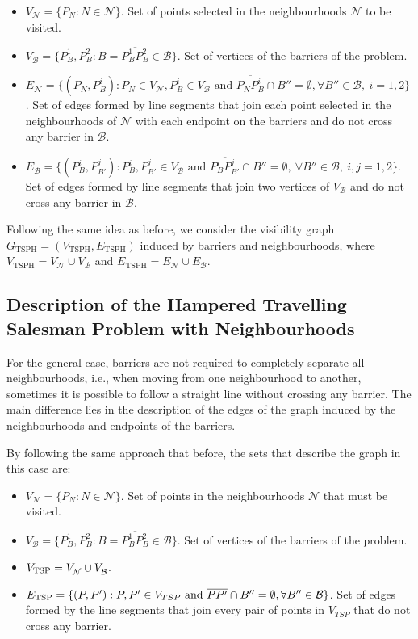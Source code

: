 \documentclass[a4paper,  review, authoryear, 1p.]{elsarticle}
\newcommand{\TSPN}{{\sf{H-TSPN}\xspace }}
\newcommand{\B}{{\mathcal B}}
\newcommand{\VB}{{V^{}_{\mathcal B}}}
\newcommand{\EB}{{E^{}_{\mathcal B}}}
\newcommand{\VN}{{V^{}_{\mathcal N}}}
\newcommand{\EN}{{E^{}_{\mathcal N}}}
\newcommand{\GTSPH}{{G_{\text{TSPH}}}}
\newcommand{\VTSPH}{{V_{\text{TSPH}}}}
\newcommand{\ETSPH}{{E_{\text{TSPH}}}}
\newcommand{\CV}[1]{{\color{red}#1}}
\begin{document}
	\begin{itemize}
		\item $\VN=\{P_N:N\in\mathcal N\}$. Set of points selected in the neighbourhoods $\mathcal N$ to be visited.
		\item $\VB=\{P^1_B, P^2_B:B=\overline{P^1_B P^2_B}\in \mathcal B\}$. Set of vertices of the barriers of the problem.
		\item $\EN=\{(P_N, P^i_{B}):P_N\in\VN, P^i_B\in V_\B\text{ and } \overline{P_NP^i_B}\cap B''=\emptyset,\forall B''\in\B,\:i=1,2\}$. Set of edges formed by line segments that join each point selected in the neighbourhoods of $\mathcal N$ with each endpoint on the barriers and do not cross any barrier in $\B$.
		\item $\EB=\{(P^{i}_B, P^{j}_{B'}):P^i_B, P^j_{B'}\in \VB \text{ and } \overline{P^i_B P^j_{B'}}\cap B''=\emptyset,\:\forall B''\in\mathcal B,\:i, j=1,2\}$. Set of edges formed by line segments that join two vertices of $V_{\mathcal B}$ and do not cross any barrier in $\B$.
	\end{itemize} 
	
	Following the same idea as before, we consider the \CV{visibility} graph $\GTSPH=(\VTSPH,\ETSPH)$ induced by barriers and neighbourhoods, where $\VTSPH=\VN\cup\VB$ and $\ETSPH=\EN\cup\EB$.
	
	
	\subsection{Description of the Hampered Travelling Salesman Problem with Neighbourhoods}
	For the general case, barriers are not required to completely separate all neighbourhoods, i.e., when moving from one neighbourhood to another, sometimes it is possible to follow a straight line without crossing any barrier. The main difference lies in the description of the edges of the graph induced by the neighbourhoods and endpoints of the barriers.
	
	By following the same approach that before, the sets that describe the graph in this case are:
	
	\begin{itemize}
		\item $\VN=\{P_N:N\in\mathcal N\}$. Set of points in the neighbourhoods $\mathcal N$ that must be visited.
		\item $\VB=\{P^1_B, P^2_B:B=\overline{P^1_B P^2_B}\in \mathcal B\}$. Set of vertices of the barriers of the problem.
		\item $V_{\rm TSP} = \VN \cup \VB$.
		\item $E_{\rm TSP}=\{(P, P'):P, P' \in V_{TSP} \text{ and } \overline{PP'}\cap B''=\emptyset,\forall B''\in\B\}$. Set of edges formed by the line segments that join every pair of points in $V_{TSP}$ that do not cross any barrier.
	\end{itemize} 
	
\end{document}
